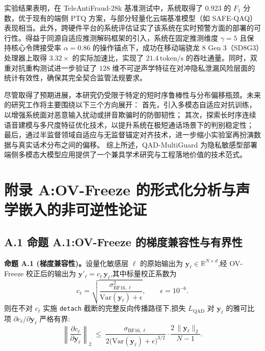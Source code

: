 \documentclass[11pt, a4paper]{article}
\begin{document}
实验结果表明，在 TeleAntiFraud-28k 基准测试中，系统取得了 $0.923$ 的 $F_1$ 分数，优于现有的端侧 PTQ 方案，与部分轻量化云端基准模型（如 SAFE-QAQ）表现相当。此外，跨硬件平台的系统评估证实了该系统在实时预警方面的部署的可行性。得益于同源自适应推测解码框架的引入，系统在固定推测维度 $\gamma = 5$ 且保持核心令牌接受率 $\alpha = 0.86$ 的操作锚点下，成功在移动端骁龙 8 Gen 3（SD8G3）处理器上取得 $3.32\times$ 的实际加速比，实现了 $21.4\,\mathrm{token/s}$ 的吞吐通量。同时，双重对抗重构测试进一步验证了 $128$ 维不可逆声学特征在对冲隐私泄漏风险层面的统计有效性，确保其完全契合监管法规要求。

尽管取得了预期进展，本研究仍受限于特定的短时序鲁棒性与分布偏移瓶颈。未来的研究工作将主要围绕以下三个方向展开：
首先，引入多模态自适应对抗训练，以增强系统面对恶意输入扰动或拼音欺骗时的防御韧性；
其次，探索长时序连续语音建模与多尺度特征优化技术，以提升系统在极短通话场景下的判别稳定性；
最后，通过半监督领域自适应与无监督锚定对齐技术，进一步缩小实验室再扮演数据与真实话术分布之间的偏移。
综上所述，QAD-MultiGuard 为隐私敏感型部署端侧多模态大模型应用提供了一个兼具学术研究与工程落地价值的技术范式。
\newpage



\appendix
\section*{附录 A:OV-Freeze 的形式化分析与声学嵌入的非可逆性论证}

\subsection*{A.1 命题 A.1:OV-Freeze 的梯度兼容性与有界性}

\noindent\textbf{命题 A.1 (梯度兼容性)。}\quad 设量化敏感层 $\ell$ 的原始输出为 $\bm{y}_\ell\in\mathbb{R}^{N\times d}$,经 OV-Freeze 校正后的输出为 $\bm{y}'_\ell = c_\ell\,\bm{y}_\ell$,其中标量校正系数为
\[
c_\ell = \sqrt{\frac{\sigma^2_{\mathrm{BF16},\ell}}{\mathrm{Var}(\bm{y}_\ell)+\epsilon}},
\qquad \epsilon = 10^{-6}.
\]
则在不对 $c_\ell$ 实施 \texttt{detach} 截断的完整反向传播路径下,损失 $L_{\mathrm{QAD}}$ 对 $\bm{y}_\ell$ 的雅可比项 $\partial c_\ell/\partial\bm{y}_\ell$ 严格有界:
\begin{equation}
\label{eq:appendix-grad-bound}
\left\|\frac{\partial c_\ell}{\partial \bm{y}_\ell}\right\|_2
\;\le\;
\frac{\sigma_{\mathrm{BF16},\ell}}{2\bigl(\mathrm{Var}(\bm{y}_\ell)+\epsilon\bigr)^{3/2}}
\cdot
\frac{2\,\|\bm{y}_\ell\|_2}{N-1}.
\end{equation}
\end{document}
